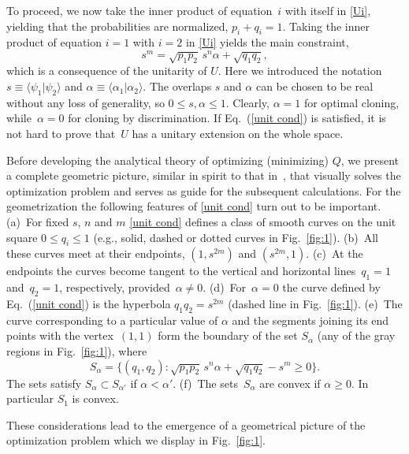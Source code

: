 \documentclass[aps,prl,twocolumn,showpacs]{revtex4}
\newcommand{\bk}[2]{\langle #1|#2\rangle}
\begin{document}
To proceed, we now take the inner product of equation~$i$ with itself in \eqref{Ui}, yielding that the probabilities are normalized, $p_i+q_i=1$. Taking the inner product of equation $i=1$ with $i=2$ in \eqref{Ui} yields the main constraint, 
%
\begin{equation}
s^m=\sqrt{p_1 p_2}\, s^n \alpha+\sqrt{q_1 q_2},
\label{unit cond}
\end{equation}
%
which is a consequence of the unitarity of $U$. Here we introduced the notation $s \equiv \bk {\psi_1}{\psi_2}$ and  $\alpha \equiv \langle\alpha_1|\alpha_2\rangle$. The overlaps $s$ and $\alpha$ can be chosen to be real without any loss of generality, so $0 \le s, \alpha \le 1$.  Clearly, $\alpha=1$ for optimal cloning, while~$\alpha=0$ for cloning by discrimination. If Eq.~(\ref{unit cond}) is satisfied, it is not hard to prove that~$U$ has a unitary extension on the whole space.  

Before developing the analytical theory of optimizing (minimizing) $Q$, we present a complete geometric picture, similar in spirit to that in~\cite{Bergou1}, that visually solves the optimization problem and serves as guide for the subsequent calculations. 
For the geometrization the following features of \eqref{unit cond} turn out to be important. (a)~For fixed $s$, $n$ and $m$ \eqref{unit cond} defines a class of smooth curves on the unit square $0\le q_i\le 1$ (e.g., solid, dashed or dotted curves in Fig.~\ref{fig:1}). (b)~All these curves meet at their endpoints, $(1,s^{2m})$ and $(s^{2m},1)$. (c)~At the endpoints  the curves become tangent to the vertical and horizontal lines~$q_1=1$ and~$q_2=1$, respectively, provided~$\alpha\not=0$. 
(d)~For~$\alpha=0$ the curve defined by Eq.~(\ref{unit cond}) is the hyperbola $q_1 q_2=s^{2m}$ (dashed line in Fig.~\ref{fig:1}). (e)~The curve corresponding to a particular value of $\alpha$ and the segments joining its end points with the vertex~$(1,1)$ form the boundary of the set $S_{\alpha}$ (any of the gray regions in Fig.~\ref{fig:1}), where
%
\begin{equation}
S_\alpha=\{ (q_1,q_2): \sqrt{p_1 p_2}\,s^n\alpha+\sqrt{q_1 q_2}-s^m\ge 0\}.
\label{S_alpha}
\end{equation}
%
The sets satisfy $S_{\alpha} \subset S_{\alpha'}$ if $\alpha<\alpha'$.
(f)~The sets~$S_\alpha$ are convex if $\alpha \ge 0$. In particular $S_1$ is convex.

These considerations lead to the emergence of a geometrical picture of the optimization problem which we display in Fig.~\ref{fig:1}.
\end{document}
